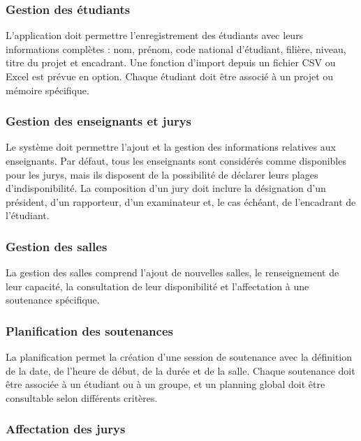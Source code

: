 \documentclass[12pt,a4paper]{article}
\begin{document}
\subsubsection{Gestion des étudiants}
\label{subsubsec:gestion_etudiants}

L'application doit permettre l'enregistrement des étudiants avec leurs
informations complètes : nom, prénom, code national d'étudiant, filière, niveau,
titre du projet et encadrant. Une fonction d'import depuis un fichier CSV ou
Excel est prévue en option. Chaque étudiant doit être associé à un projet ou
mémoire spécifique.

\subsubsection{Gestion des enseignants et jurys}
\label{subsubsec:gestion_enseignants}

Le système doit permettre l'ajout et la gestion des informations relatives aux
enseignants. Par défaut, tous les enseignants sont considérés comme disponibles
pour les jurys, mais ils disposent de la possibilité de déclarer leurs plages
d'indisponibilité. La composition d'un jury doit inclure la désignation d'un
président, d'un rapporteur, d'un examinateur et, le cas échéant, de l'encadrant
de l'étudiant.

\subsubsection{Gestion des salles}
\label{subsubsec:gestion_salles}

La gestion des salles comprend l'ajout de nouvelles salles, le renseignement de
leur capacité, la consultation de leur disponibilité et l'affectation à une
soutenance spécifique.

\subsubsection{Planification des soutenances}
\label{subsubsec:planification}

La planification permet la création d'une session de soutenance avec la
définition de la date, de l'heure de début, de la durée et de la salle. Chaque
soutenance doit être associée à un étudiant ou à un groupe, et un planning
global doit être consultable selon différents critères.

\subsubsection{Affectation des jurys}
\label{subsubsec:affectation_jurys}
\end{document}
